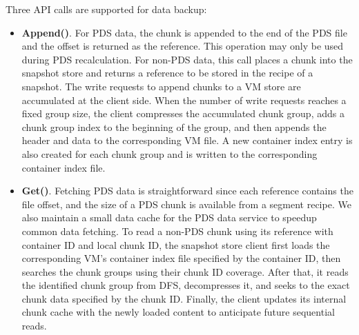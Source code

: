 Three API calls are supported for data backup:
\begin{itemize}

\item
\noindent\textbf{Append()}. 
For PDS data, the chunk is appended to the end of the PDS file and the offset is returned as the  reference.
This operation  may only be used during PDS recalculation.
For non-PDS data, this call places a chunk into 
the snapshot store and returns a reference to be stored in the recipe of a snapshot. 
The write requests to append chunks to a VM store are accumulated at the client side. 
When the number of write requests reaches a fixed group size, the client compresses
the accumulated   chunk group, adds a chunk group index  to the beginning of the group, and then
appends the header and data  to the corresponding VM file.
A new container  index entry is also created for each chunk group and is written to the corresponding
container index file.

\item
\noindent\textbf{Get()}.
Fetching PDS data is straightforward since each reference contains 
the file offset, and the size of a PDS chunk is available from a segment recipe.
We also maintain a small data cache for the PDS data service to speedup common data fetching.
To read a non-PDS chunk using its reference with container ID and local chunk ID,  the snapshot store client 
first loads the
corresponding VM's container index file specified by the container ID, then searches the chunk
groups  using their  chunk ID coverage.
After that, it reads the identified chunk group from DFS, decompresses it, and seeks to the exact chunk data 
specified by the chunk ID. 
Finally, the client updates its internal chunk cache with the newly loaded content to 
anticipate future sequential reads.


\end{itemize}
